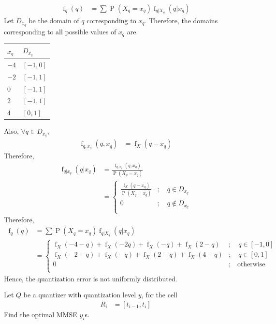 \documentclass[titlepage, fleqn, a4paper, 12pt, twoside]{article}
\theoremstyle{definition}
\theoremstyle{theorem}
\DeclareMathOperator{\pdf}{\mathrm{f}}
\DeclareMathOperator{\prob}{\mathrm{P}}
\begin{document}
\begin{solution}
	\begin{align*}
		\pdf_q(q) &= \sum \prob(X_q = x_q) \pdf_{q|X_q}(q | x_q)
	\end{align*}
	Let $D_{x_q}$ be the domain of $q$ corresponding to $x_q$.
	Therefore, the domains corresponding to all possible values of $x_q$ are
	\begin{table}[H]
		\centering
		\begin{tabular}{l l}
			\toprule
			$x_q$ & $D_{x_q}$\\
			\midrule
			$-4$ & $[-1,0]$\\
			$-2$ & $[-1,1]$\\
			$0$ & $[-1,1]$\\
			$2$ & $[-1,1]$\\
			$4$ & $[0,1]$\\
			\bottomrule
		\end{tabular}
	\end{table}
	Also, $\forall q \in D_{x_q}$,
	\begin{align*}
		\pdf_{q,x_q}(q,x_q) &= \pdf_X(q - x_q)
	\end{align*}
	Therefore,
	\begin{align*}
		\pdf_{q|x_q}(q|x_q) &= \frac{\pdf_{q,x_q}(q,x_q)}{\prob(X_q = x_q)}\\
		&=
			\begin{cases}
				\frac{\pdf_X(q - x_q)}{\prob(X_q = x_q)} &;\quad q \in D_{x_q}\\
				0 &;\quad q \notin D_{x_q}\\
			\end{cases}
	\end{align*}
	Therefore,
	\begin{align*}
		\pdf_q(q) &= \sum \prob(X_q = x_q) \pdf_{q|X_q}(q | x_q)\\
		&=
			\begin{cases}
				\pdf_X(-4 - q) + \pdf_X(-2  q) + \pdf_X(-q) + \pdf_X(2 - q) &;\quad q \in [-1,0]\\
				\pdf_X(-2 - q) + \pdf_X(-q) + \pdf_X(2 - q) + \pdf_X(4 - q) &;\quad q \in [0,1]\\
				0 &;\quad \text{otherwise}\\
			\end{cases}
	\end{align*}
	Hence, the quantization error is not uniformly distributed.
\end{solution}

\begin{question}
	Let $Q$ be a quantizer with quantization level $y$, for the cell
	\begin{align*}
		R_i &= [t_{i - 1},t_i]
	\end{align*}
	Find the optimal MMSE $y_i$s.
\end{question}
\end{document}
